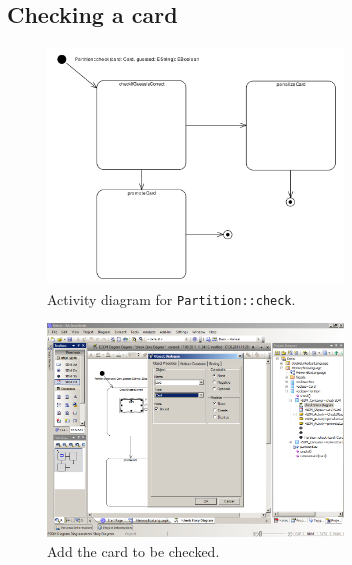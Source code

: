 \subsection{Checking a card}
\begin{figure}[htp]
\begin{center}
  \includegraphics[width=0.7\textwidth]{pics/sdmBilder/check/sdm16RAW}
  \caption{Activity diagram for \texttt{Partition::check}.}  
  \label{fig:sdm_check_start}
\end{center}
\end{figure}

\begin{figure}[htp]
\begin{center}
  \includegraphics[width=0.7\textwidth]{pics/sdmBilder/check/sdm17RAW}
  \caption{Add the card to be checked.}  
  \label{fig:sdm_check_addCard}
\end{center}
\end{figure}

